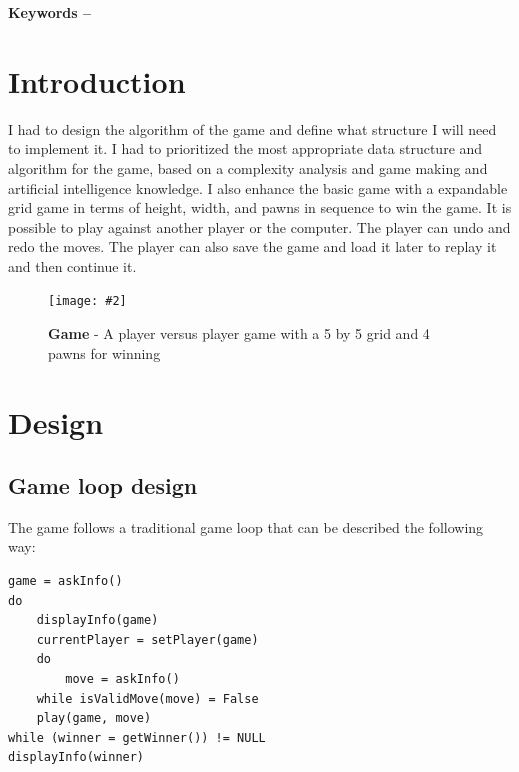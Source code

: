 \documentclass[10pt, a4paper]{article}
\title{\mytitle}
\author{\myauthor\hspace{1em}\\\contact\\Edinburgh Napier University\hspace{0.5em}-\hspace{0.5em}\mymodule}
\date{}
\newcommand{\figuremacro}[5]{
    \begin{figure}[#1]
        \centering
        \texttt{[image: \#2]}
        \caption[#3]{\textbf{#3}#4}
        \label{fig:#2}
    \end{figure}
}
\begin{document}
    \maketitle
    \begin{abstract}
	This document is a report for the first coursework in the algorithm and data structure module \cite{module}. For this coursework, we had to build a console user interface tic tac toe game using the C language and standard library. The objective is to demonstrate our understanding of the basics data structure, and evaluate the performance of an algorithm
based on the size of a problem input, but also to demonstrate a working knowledge of a
relevant data structures API and design and develop and evaluate data structures
and algorithms.
    \end{abstract}

\textbf{Keywords -- }{\mykeywords} 

\section{Introduction}
I had to design the algorithm of the game and define what structure I will need to implement it. I had to prioritized the most appropriate data structure and algorithm for the game, based on a complexity analysis and game making and artificial intelligence knowledge. I also enhance the basic game with a expandable grid game in terms of height, width, and pawns in sequence to win the game. It is possible to play against another player or the computer. The player can undo and redo the moves. The player can also save the game and load it later to replay it and then continue it.

\figuremacro{h}{game}{Game}{ - A player versus player game with a 5 by 5 grid and 4 pawns for winning}{1.0}


\section{Design}

\subsection{Game loop design}

The game follows a traditional game loop that can be described the following way:
\begin{lstlisting}[caption = Game loop]
game = askInfo()
do
	displayInfo(game)
	currentPlayer = setPlayer(game)
	do
		move = askInfo()
	while isValidMove(move) = False
	play(game, move)
while (winner = getWinner()) != NULL
displayInfo(winner)
\end{lstlisting}
\end{document}

